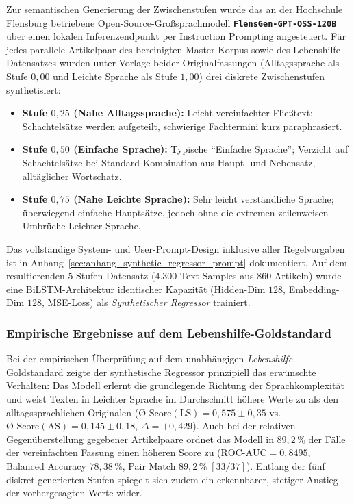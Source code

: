 Zur semantischen Generierung der Zwischenstufen wurde das an der Hochschule Flensburg betriebene Open-Source-Großsprachmodell \textbf{\texttt{FlensGen-GPT-OSS-120B}} über einen lokalen Inferenzendpunkt per Instruction Prompting angesteuert. Für jedes parallele Artikelpaar des bereinigten Master-Korpus sowie des Lebenshilfe-Datensatzes wurden unter Vorlage beider Originalfassungen (Alltagssprache als Stufe $0{,}00$ und Leichte Sprache als Stufe $1{,}00$) drei diskrete Zwischenstufen synthetisiert:
\begin{itemize}
    \item \textbf{Stufe $0{,}25$ (Nahe Alltagssprache):} Leicht vereinfachter Fließtext; Schachtelsätze werden aufgeteilt, schwierige Fachtermini kurz paraphrasiert.
    \item \textbf{Stufe $0{,}50$ (Einfache Sprache):} Typische \enquote{Einfache Sprache}; Verzicht auf Schachtelsätze bei Standard-Kombination aus Haupt- und Nebensatz, alltäglicher Wortschatz.
    \item \textbf{Stufe $0{,}75$ (Nahe Leichte Sprache):} Sehr leicht verständliche Sprache; überwiegend einfache Hauptsätze, jedoch ohne die extremen zeilenweisen Umbrüche Leichter Sprache.
\end{itemize}

Das vollständige System- und User-Prompt-Design inklusive aller Regelvorgaben ist in Anhang~\ref{sec:anhang_synthetic_regressor_prompt} dokumentiert. Auf dem resultierenden $5$-Stufen-Datensatz ($4.300$ Text-Samples aus $860$ Artikeln) wurde eine BiLSTM-Architektur identischer Kapazität (Hidden-Dim $128$, Embedding-Dim $128$, MSE-Loss) als \textit{Synthetischer Regressor} trainiert.

\subsubsection{Empirische Ergebnisse auf dem Lebenshilfe-Goldstandard}
\label{sec:synthetische_ergebnisse_vergleich}

Bei der empirischen Überprüfung auf dem unabhängigen \textit{Lebenshilfe}-Goldstandard zeigte der synthetische Regressor prinzipiell das erwünschte Verhalten: Das Modell erlernt die grundlegende Richtung der Sprachkomplexität und weist Texten in Leichter Sprache im Durchschnitt höhere Werte zu als den alltagssprachlichen Originalen ($\text{\O{}-Score}(\text{LS}) = 0{,}575 \pm 0{,}35$ vs. $\text{\O{}-Score}(\text{AS}) = 0{,}145 \pm 0{,}18$, $\Delta = +0{,}429$). Auch bei der relativen Gegenüberstellung gegebener Artikelpaare ordnet das Modell in $89{,}2\,\%$ der Fälle der vereinfachten Fassung einen höheren Score zu ($\text{ROC-AUC} = 0{,}8495$, Balanced Accuracy $78{,}38\,\%$, Pair Match $89{,}2\,\%\; [33/37]$). Entlang der fünf diskret generierten Stufen spiegelt sich zudem ein erkennbarer, stetiger Anstieg der vorhergesagten Werte wider.

